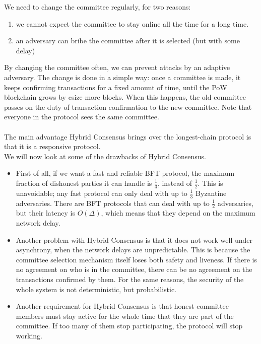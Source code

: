 We need to change the committee regularly, for two reasons:
\begin{enumerate}
	\item we cannot expect the committee to stay online all the time for a long time.
	\item an adversary can bribe the committee after it is selected (but with some delay)
\end{enumerate}
By changing the committee often, we can prevent attacks by an adaptive adversary. The change is done in a simple way: once a committee is made, it keeps confirming transactions for a fixed amount of time, until the PoW blockchain grows by csize more blocks. When this happens, the old committee passes on the duty of transaction confirmation to the new committee. Note that everyone in the protocol sees the same committee.\\\\
The main advantage Hybrid Consensus brings over the longest-chain protocol is that it is a responsive protocol.\\
We will now look at some of the drawbacks of Hybrid Consensus.
\begin{itemize}
	\item  First of all, if we want a fast and reliable BFT protocol, the maximum fraction of dishonest parties it can handle is $\frac{1}{3}$, instead of $\frac{1}{2}$. This is unavoidable; any fast protocol can only deal with up to $\frac{1}{3}$ Byzantine adversaries. There are BFT protocols that can deal with up to $\frac{1}{2}$ adversaries, but their latency is $O(\Delta)$, which means that they depend on the maximum network delay.
	\item Another problem with Hybrid Consensus is that it does not work well under asynchrony, when the network delays are unpredictable. This is because the committee selection mechanism itself loses both safety and liveness. If there is no agreement on who is in the committee, there can be no agreement on the transactions confirmed by them. For the same reasons, the security of the whole system is not deterministic, but probabilistic.
	\item Another requirement for Hybrid Consensus is that honest committee members must stay active for the whole time that they are part of the committee. If too many of them stop participating, the protocol will stop working.
\end{itemize}
